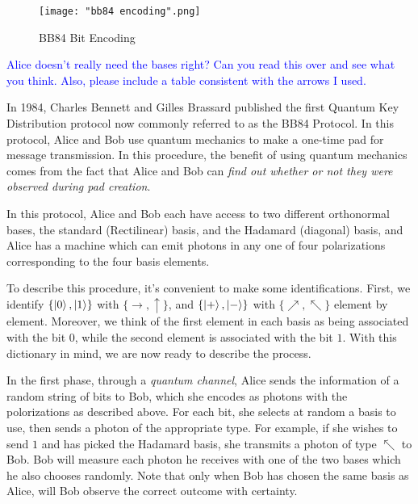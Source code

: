 \begin{figure}[h]
    \centering
    \texttt{[image: "bb84 encoding".png]}
    \caption{BB84 Bit Encoding \protect\footnotemark}
    \label{fig:BB84 bit encoding}
\end{figure}


\textcolor{blue}{Alice doesn't really need the bases right?  Can you read this over and see what you think.  Also, please include a table consistent with the arrows I used.}

In 1984, Charles Bennett and Gilles Brassard published the first Quantum Key Distribution protocol \cite{Bennett1984} now commonly referred to as the BB84 Protocol. In this protocol, Alice and Bob use quantum mechanics to make a one-time pad for message transmission.  In this procedure, the benefit of using quantum mechanics comes from the fact that Alice and Bob can {\emph{find out whether or not they were observed during pad creation}}. 

In this protocol, Alice and Bob each have access to two different orthonormal bases, the standard (Rectilinear) basis, and the Hadamard (diagonal) basis, and Alice has a machine which can emit photons in any one of four polarizations corresponding to the four basis elements.  

To describe this procedure, it's convenient to make some identifications.  First, we identify $\{\ket{0},\ket{1}\}$ with $\{\rightarrow, \uparrow\}$, and $\{\ket{+}, \ket{-}\}$ with $\{\nearrow, \nwarrow\}$ element by element.  Moreover, we think of the first element in each basis as being associated with the bit $0$, while the second element is associated with the bit $1$.  With this dictionary in mind, we are now ready to describe the process.




In the first phase, through a {\emph{quantum channel}}, Alice sends the information of a random string of bits to Bob, which she encodes as photons with the polorizations as described above. For each bit, she selects at random a basis to use, then sends a photon of the appropriate type.  For example, if she wishes to send $1$ and has picked the Hadamard basis, she transmits a photon of type $\nwarrow$ to Bob.  Bob will measure each photon he receives with one of the two bases which he also chooses randomly. Note that only when Bob has chosen the same basis as Alice, will Bob observe the correct outcome with certainty.  

